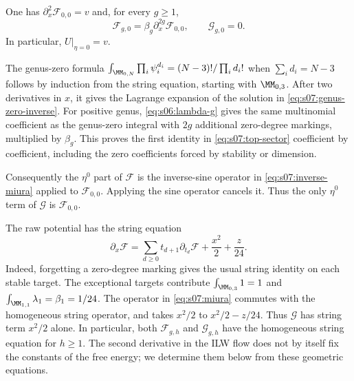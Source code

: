 \begin{lmm}\label{lmm:s07:top-sector}
One has $\partial_x^2\mathcal F_{0,0}=v$ and, for every $g\geq1$,
\begin{equation}\label{eq:s07:top-sector}
 \mathcal F_{g,0}=\beta_g\partial_x^{2g}\mathcal F_{0,0},
 \qquad \mathcal G_{g,0}=0.
\end{equation}
In particular, $U|_{\eta=0}=v$.
\end{lmm}
\begin{prf}
The genus-zero formula
$\int_{\MM_{0,N}}\prod_i\psi_i^{d_i}
=(N-3)!/\prod_i d_i!$ when $\sum_i d_i=N-3$ follows by induction
from the string equation, starting with $\MM_{0,3}$.
After two derivatives in $x$, it gives the Lagrange expansion of the
solution in \eqref{eq:s07:genus-zero-inverse}. For positive genus,
\eqref{eq:s06:lambda-g} gives the same multinomial coefficient as
the genus-zero integral with $2g$ additional zero-degree markings,
multiplied by $\beta_g$. This proves the first identity in
\eqref{eq:s07:top-sector} coefficient by coefficient, including the
zero coefficients forced by stability or dimension.

Consequently the $\eta^0$ part of $\mathcal F$ is the inverse-sine
operator in \eqref{eq:s07:inverse-miura} applied to
$\mathcal F_{0,0}$. Applying the sine operator cancels it. Thus the
only $\eta^0$ term of $\mathcal G$ is $\mathcal F_{0,0}$.
\end{prf}

\begin{rmk}\label{rmk:s07:string}
The raw potential has the string equation
\begin{equation}\label{eq:s07:string}
 \partial_x\mathcal F
 =\sum_{d\geq0}t_{d+1}\partial_{t_d}\mathcal F
                 +\frac{x^2}{2}+\frac z{24}.
\end{equation}
Indeed, forgetting a zero-degree marking gives the usual string
identity on each stable target. The exceptional targets contribute
$\int_{\MM_{0,3}}1=1$ and
$\int_{\MM_{1,1}}\lambda_1=\beta_1=1/24$.
The operator in \eqref{eq:s07:miura} commutes with the homogeneous
string operator, and takes $x^2/2$ to $x^2/2-z/24$.
Thus $\mathcal G$ has string term $x^2/2$ alone. In particular,
both $\mathcal F_{g,h}$ and $\mathcal G_{g,h}$ have the homogeneous
string equation for $h\geq1$. The second derivative in the ILW flow
does not by itself fix the constants of the free energy; we determine
them below from these geometric equations.
\end{rmk}
